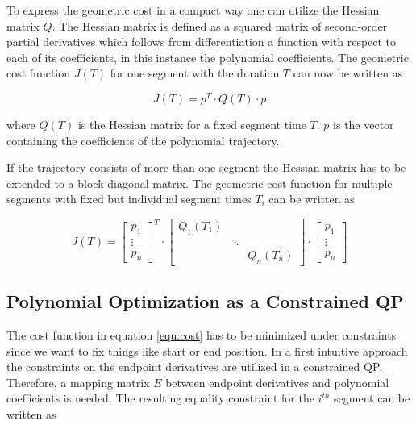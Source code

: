 To express the geometric cost in a compact way one can utilize the Hessian matrix $Q$. The Hessian matrix is defined as a squared matrix of second-order partial derivatives which follows from differentiation a function with respect to each of its coefficients, in this instance the polynomial coefficients. The geometric cost function $J(T)$ for one segment with the duration $T$ can now be written as

\begin{equation}
J(T)  = p^T \cdot Q(T) \cdot p
\end{equation}

where $Q(T)$ is the Hessian matrix for a fixed segment time $T$. $p$ is the vector containing the coefficients of the polynomial trajectory. \newline

If the trajectory consists of more than one segment the Hessian matrix has to be extended to a block-diagonal matrix. The geometric cost function for multiple segments with fixed but individual segment times $T_i$ can be written as

\begin{equation}
J(T) =
\begin{bmatrix}
   p_1 \\
\vdots \\
  p_n
\end{bmatrix}^T
\cdot
\begin{bmatrix}
   Q_1(T_1) &  &  \\
    & \ddots &  \\
   & & Q_n(T_n)
\end{bmatrix} 
\cdot
\begin{bmatrix}
   p_1 \\
\vdots \\
  p_n
\end{bmatrix}
\label{equ:cost}
\end{equation}


\subsection{Polynomial Optimization as a Constrained QP}

The cost function in equation \ref{equ:cost} has to be minimized under constraints since we want to fix things like start or end position. In a first intuitive approach the constraints on the endpoint derivatives are utilized in a constrained QP. Therefore, a mapping matrix $E$ between endpoint derivatives and polynomial coefficients is needed. The resulting equality constraint for the $i^{th}$ segment can be written as

